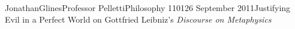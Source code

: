 \documentclass[12pt,letterpaper]{article}
\begin{document}
\begin{mla}{Jonathan}{Glines}{Professor Pelletti}{Philosophy 1101}{26 September 2011}{Justifying Evil in a Perfect World on Gottfried Leibniz's \textit{Discourse on Metaphysics}}

%


\end{mla}
\end{document}
